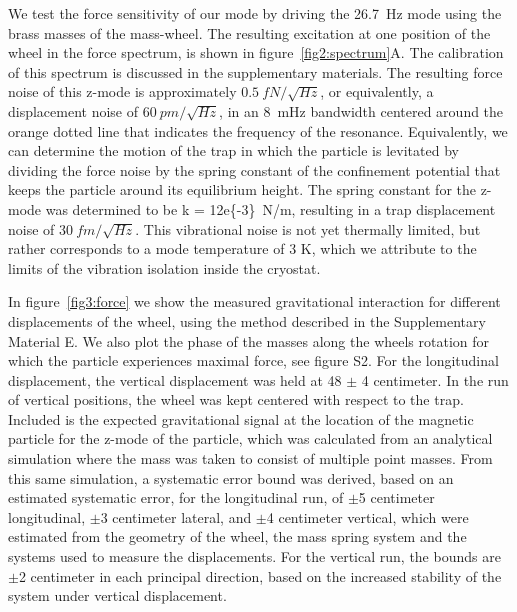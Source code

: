 \documentclass[pdflatex,sn-mathphys]{sn-jnl}
\begin{document}
    We test the force sensitivity of our mode by driving the \SI{26.7}{Hz} mode using the brass masses of the mass-wheel. 
    The resulting excitation at one position of the wheel in the force spectrum, is shown in figure~\ref{fig2:spectrum}A. 
    The calibration of this spectrum is discussed in the supplementary materials. 
    The resulting force noise of this z-mode is approximately $\SI{0.5}{fN/\sqrt{Hz}}$,  or equivalently, a displacement noise of $\SI{60}{pm/\sqrt{Hz}}$, in an \SI{8}{mHz} bandwidth centered around the orange dotted line that indicates the frequency of the resonance. 
    Equivalently, we can determine the motion of the trap in which the particle is levitated by dividing the force noise by the spring constant of the confinement potential that keeps the particle around its equilibrium height. 
    The spring constant for the z-mode was determined to be k = \SI{12e{-3}}{N/m}, resulting in a trap displacement noise of $\SI{30}{fm/\sqrt{Hz}}$.
    This vibrational noise is not yet thermally limited, but rather corresponds to a mode temperature of 3 K, which we attribute to the limits of the vibration isolation inside the cryostat.
    
    In figure~\ref{fig3:force} we show the measured gravitational interaction for different displacements of the wheel, using the method described in the Supplementary Material E. We also plot the phase of the masses along the wheels rotation for which the particle experiences maximal force, see figure S2. For the longitudinal displacement, the vertical displacement was held at \SI{48}{} $\pm$ \SI{4}{} centimeter. In the run of vertical positions, the wheel was kept centered with respect to the trap. Included is the expected gravitational signal at the location of the magnetic particle for the z-mode of the particle, which was calculated from an analytical simulation where the mass was taken to consist of multiple point masses. From this same simulation, a systematic error bound was derived, based on an estimated systematic error, for the longitudinal run, of $\pm$5 centimeter longitudinal, $\pm$3 centimeter lateral, and $\pm$4 centimeter vertical, which were estimated from the geometry of the wheel, the mass spring system and the systems used to measure the displacements. For the vertical run, the bounds are $\pm$2 centimeter in each principal direction, based on the increased stability of the system under vertical displacement.
\end{document}
